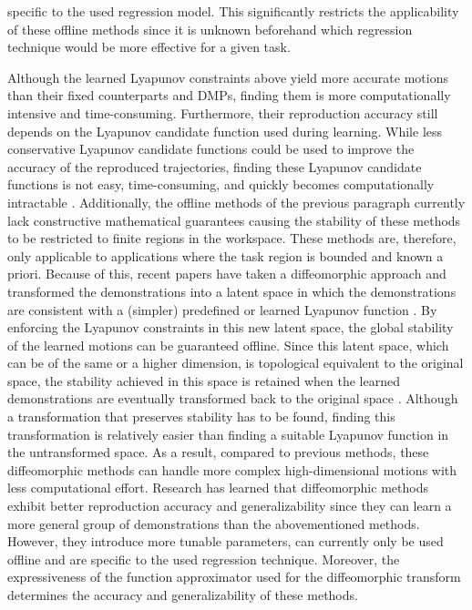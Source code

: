 specific to the used regression model. This significantly restricts the applicability of these offline methods since it is unknown beforehand which regression technique would be more effective for a given task.

Although the learned Lyapunov constraints above yield more accurate motions than their fixed counterparts and DMPs, finding them is more computationally intensive and time-consuming. Furthermore, their reproduction accuracy still depends on the Lyapunov candidate function used during learning. While less conservative Lyapunov candidate functions could be used to improve the accuracy of the reproduced trajectories, finding these Lyapunov candidate functions is not easy, time-consuming, and quickly becomes computationally intractable \cite{ravanbakhshLearningControlLyapunov2019,havensImitationLearningLinear2021,tesfazgiInverseReinforcementLearning2021}. Additionally, the offline methods of the previous paragraph currently lack constructive mathematical guarantees causing the stability of these methods to be restricted to finite regions in the workspace. These methods are, therefore, only applicable to applications where the task region is bounded and known a priori. Because of this, recent papers have taken a diffeomorphic approach and transformed the demonstrations into a latent space in which the demonstrations are consistent with a (simpler) predefined or learned Lyapunov function \cite{neumannLearningRobotMotions2015,perrinFastDiffeomorphicMatching2016,jinLearningAccurateStable2019,ranaEuclideanizingFlowsDiffeomorphic2020,gaoLearningDynamicalSystem2021,urainImitationFlowLearningDeep2020,takeishiLearningDynamicsModels2021,ficheraLinearizationIdentificationMultipleAttractor2022,guptaLearningHighDimensional2022,zhiDiffeomorphicTransformsGeneralised2022,zhangLearningAccurateStable2022,saverianoLearningStableRobotic2022,urainLearningStableVector2022,wangLearningDeepRobotic2022,zhangLearningRiemannianStable2022}. By enforcing the Lyapunov constraints in this new latent space, the global stability of the learned motions can be guaranteed offline. Since this latent space, which can be of the same or a higher dimension, is topological equivalent to the original space, the stability achieved in this space is retained when the learned demonstrations are eventually transformed back to the original space \cite{leeIntroductionTopologicalManifolds2011,leeIntroductionSmoothManifolds2012,leeIntroductionRiemannianManifolds2018}. Although a transformation that preserves stability has to be found, finding this transformation is relatively easier than finding a suitable Lyapunov function in the untransformed space. As a result, compared to previous methods, these diffeomorphic methods can handle more complex high-dimensional motions with less computational effort. Research has learned that diffeomorphic methods exhibit better reproduction accuracy and generalizability since they can learn a more general group of demonstrations than the abovementioned methods. However, they introduce more tunable parameters, can currently only be used offline and are specific to the used regression technique. Moreover, the expressiveness of the function approximator used for the diffeomorphic transform determines the accuracy and generalizability of these methods.

